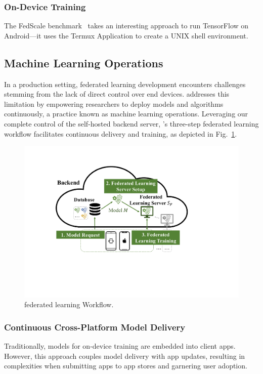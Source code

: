 \subsubsection{On-Device Training}

The FedScale benchmark~\cite{lai2022fedscale} takes an interesting approach to
run TensorFlow on Android---it uses the Termux Application to
create a UNIX shell environment.

\subsection{Machine Learning Operations}
\label{sec:mlops}

\newcommand{\model}{$M$}
\newcommand{\fs}{$S_\mathrm F$}
In a production setting,
federated learning development encounters challenges stemming from the lack of
direct control over end devices.
\fedkit addresses this limitation by empowering researchers to deploy models and
algorithms continuously, a practice known as machine learning operations.
Leveraging our complete control of the self-hosted backend server,
\fedkit's three-step federated learning workflow facilitates continuous delivery
and training, as depicted in Fig.~\ref{fig:fl-workflow}.

\begin{figure}\begin{center}
        \includegraphics[width=0.7\linewidth]{fl_workflow.pdf}
        \caption{\fedkit federated learning Workflow.}
        \label{fig:fl-workflow}
    \end{center}\end{figure}

\subsubsection{Continuous Cross-Platform Model Delivery}
Traditionally, models for on-device training are embedded into client apps.
However, this approach couples model delivery with app updates,
resulting in complexities when submitting apps to app stores and garnering user
adoption.


